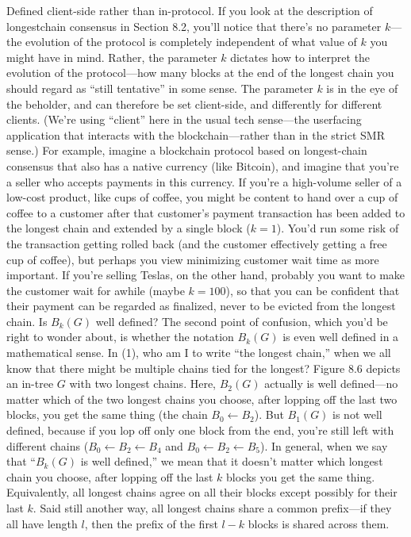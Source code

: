 Defined client-side rather than in-protocol. If you look at the description of longestchain consensus in Section 8.2, you’ll notice that there’s no parameter $k$—the evolution of the protocol is completely independent of what value of $k$ you might have in mind. Rather, the
parameter $k$ dictates how to interpret the evolution of the protocol—how many blocks at
the end of the longest chain you should regard as “still tentative” in some sense.
The parameter $k$ is in the eye of the beholder, and can therefore be set client-side, and
differently for different clients. (We’re using “client” here in the usual tech sense—the userfacing application that interacts with the blockchain—rather than in the strict SMR sense.)
For example, imagine a blockchain protocol based on longest-chain consensus that also has
a native currency (like Bitcoin), and imagine that you’re a seller who accepts payments in
this currency. If you’re a high-volume seller of a low-cost product, like cups of coffee, you
might be content to hand over a cup of coffee to a customer after that customer’s payment
transaction has been added to the longest chain and extended by a single block ($k = 1$).
You’d run some risk of the transaction getting rolled back (and the customer effectively
getting a free cup of coffee), but perhaps you view minimizing customer wait time as more
important. If you’re selling Teslas, on the other hand, probably you want to make the
customer wait for awhile (maybe $k = 100$), so that you can be confident that their payment
can be regarded as finalized, never to be evicted from the longest chain.
Is $B_k(G)$ well defined? The second point of confusion, which you’d be right to wonder
about, is whether the notation $B_k(G)$ is even well defined in a mathematical sense. In (1),
who am I to write “the longest chain,” when we all know that there might be multiple chains
tied for the longest? Figure 8.6 depicts an in-tree $G$ with two longest chains. Here, $B_2(G)$
actually is well defined—no matter which of the two longest chains you choose, after lopping
off the last two blocks, you get the same thing (the chain $B_0 \gets B_2$). But $B_1(G)$ is not well
defined, because if you lop off only one block from the end, you’re still left with different chains
($B_0 \gets B_2 \gets B_4$ and $B_0 \gets B_2 \gets B_5$). In general, when we say that “$B_k(G)$ is well defined,”
we mean that it doesn't matter which longest chain you choose, after lopping off the last $k$
blocks you get the same thing. Equivalently, all longest chains agree on all their blocks
except possibly for their last $k$. Said still another way, all longest chains share a common
prefix—if they all have length $l$, then the prefix of the first $l - k$ blocks is shared across
them.

